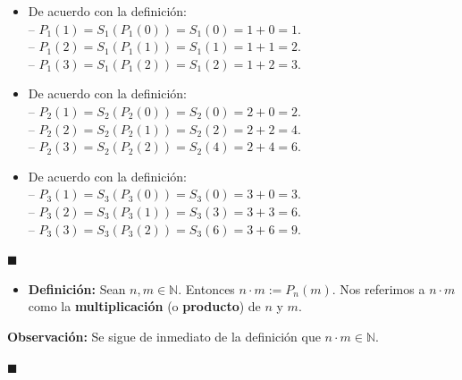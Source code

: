 \documentclass[10 pt]{article}
\begin{document}
\begin{itemize}
    \item \Large{De acuerdo con la definición: \\

    -- $P_1(1)=S_1(P_1(0))=S_1(0)=1+0=1$. \\

    -- $P_1(2)=S_1(P_1(1))=S_1(1)=1+1=2$. \\

    -- $P_1(3)=S_1(P_1(2))=S_1(2)=1+2=3$.}\\

    \item \Large{De acuerdo con la definición: \\

    -- $P_2(1)=S_2(P_2(0))=S_2(0)=2+0=2$. \\

    -- $P_2(2)=S_2(P_2(1))=S_2(2)=2+2=4$. \\

    -- $P_2(3)=S_2(P_2(2))=S_2(4)=2+4=6$.} \\

    \item \Large{De acuerdo con la definición: \\

    -- $P_3(1)=S_3(P_3(0))=S_3(0)=3+0=3$. \\

    -- $P_3(2)=S_3(P_3(1))=S_3(3)=3+3=6$. \\

    -- $P_3(3)=S_3(P_3(2))=S_3(6)=3+6=9$.}\\
\end{itemize}

\begin{flushright}
    $\blacksquare$
\end{flushright}

\begin{itemize}
    \item \Large{\textbf{Definición:} Sean $n,m \in \mathbb N$. Entonces $n \cdot m:=P_n(m)$. Nos referimos a $n \cdot m$ como la \textbf{multiplicación} (o \textbf{producto}) de $n$ y $m$.} \\
\end{itemize}

\Large{\textbf{Observación:} Se sigue de inmediato de la definición que $n \cdot m \in \mathbb N$.} \\

\begin{flushright}
    $\blacksquare$
\end{flushright}
\end{document}
